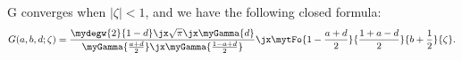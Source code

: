 {}{G}
converges when $| \zeta | < 1$, and we have the following closed formula:
\begin{equation}
    G (a, b, d ; \zeta)=
    \frac{\mydegw{2}{1 - d}\jx\sqrt{\pi}\jx\myGamma{d}}
    {\myGamma{\frac{a+d}{2}}\jx\myGamma{\frac{1-a+d}{2}}}\jx
         \mytFo{1-\frac{a+d}{2}}{\frac{1+a-d}{2}}{b+\frac{1}{2}}{\zeta}.
    \label{eqn:iF}
\end{equation}
